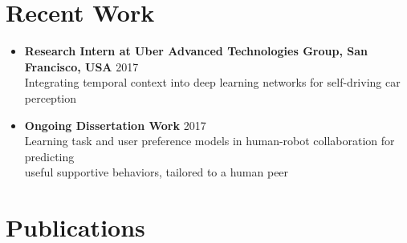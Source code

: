 \documentclass[10pt,letterpaper]{article}
\newcommand{\thing}[2]{{#1} \hfill {#2}}
\begin{document}
\section{Recent Work}
\begin{itemize}%
\item \thing{\bf Research Intern at Uber Advanced Technologies Group, San Francisco, USA}{2017}\\
      	Integrating temporal context into deep learning networks for self-driving car perception 
\item \thing{\bf Ongoing Dissertation Work}{2017}\\
	Learning task and user preference models in human-robot collaboration for predicting \\ useful supportive behaviors, tailored to a human peer \cite{grigore2017predict_supportive}
\end{itemize}

\section{Publications}
\nocite{*} %
\setlength{\biblabelsep}{0.5em} %
\printbibliography[heading=none,keyword=publication]

\end{document}

